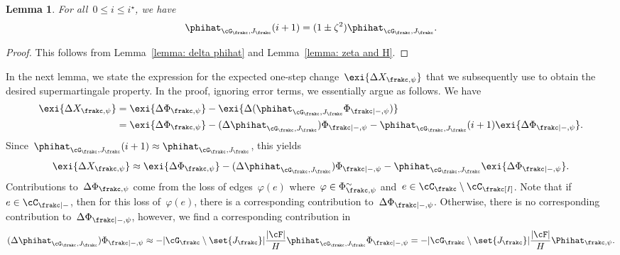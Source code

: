 \documentclass[11pt]{amsart}
\DeclarePairedDelimiter{\abs}{\lvert}{\rvert}
\def\phi{\varphi}
\newtheorem{lemma}[algocf]{Lemma}
\theoremstyle{definition}
\numberwithin{equation}{section}
\begin{document}
	\begin{lemma}\label{lemma: phihat G J next}
		For all~$0\leq i\leq i^\star$, we have
		\begin{equation*}
			\phihat_{\cG_\frakc,J_\frakc}(i+1)=(1\pm \zeta^{2})\phihat_{\cG_\frakc,J_\frakc}.
		\end{equation*}
	\end{lemma}
	\begin{proof}
		This follows from Lemma~\ref{lemma: delta phihat} and Lemma~\ref{lemma: zeta and H}.
	\end{proof}
	
	In the next lemma, we state the expression for the expected one-step change~$\exi{\Delta X_{\frakc,\psi}}$ that we subsequently use to obtain the desired supermartingale property.
	In the proof, ignoring error terms, we essentially argue as follows.
	We have
	\begin{equation}\label{equation: expected chain deviation change}
		\begin{aligned}
			\exi{\Delta X_{\frakc,\psi}}
			&=\exi{\Delta \Phi_{\frakc,\psi}}-\exi{\Delta(\phihat_{\cG_\frakc,J_\frakc}\Phi_{\frakc|-,\psi})}\\
			&=\exi{\Delta \Phi_{\frakc,\psi}}-(\Delta\phihat_{\cG_\frakc,J_\frakc})\Phi_{\frakc|-,\psi}-\phihat_{\cG_\frakc,J_\frakc}(i+1)\exi{\Delta \Phi_{\frakc|-,\psi}}.
		\end{aligned}
	\end{equation}
	Since~$\phihat_{\cG_\frakc,J_\frakc}(i+1)\approx \phihat_{\cG_\frakc,J_\frakc}$, this yields
	\begin{equation}\label{equation: heuristic chain change}
		\exi{\Delta X_{\frakc,\psi}}
		\approx\exi{\Delta \Phi_{\frakc,\psi}}-(\Delta\phihat_{\cG_\frakc,J_\frakc})\Phi_{\frakc|-,\psi}-\phihat_{\cG_\frakc,J_\frakc}\exi{\Delta \Phi_{\frakc|-,\psi}}.
	\end{equation}
	Contributions to~$\Delta\Phi_{\frakc,\psi}$ come from the loss of edges~$\phi(e)$ where~$\phi\in\Phi^\sim_{\frakc,\psi}$ and~$e\in\cC_\frakc\setminus\cC_\frakc[I]$.
	Note that if~$e\in\cC_{\frakc|-}$, then for this loss of~$\phi(e)$, there is a corresponding contribution to~$\Delta\Phi_{\frakc|-,\psi}$.
	Otherwise, there is no corresponding contribution to~$\Delta\Phi_{\frakc|-,\psi}$, however, we find a corresponding contribution in
	\begin{equation*}
		(\Delta\phihat_{\cG_\frakc,J_\frakc})\Phi_{\frakc|-,\psi}
		\approx -\abs{\cG_\frakc\setminus\set{J_\frakc}}\frac{\abs{\cF}}{H}\phihat_{\cG_\frakc,J_\frakc}\Phi_{\frakc|-,\psi}
		=-\abs{\cG_\frakc\setminus\set{J_\frakc}}\frac{\abs{\cF}}{H}\Phihat_{\frakc,\psi}.
	\end{equation*}
\end{document}
